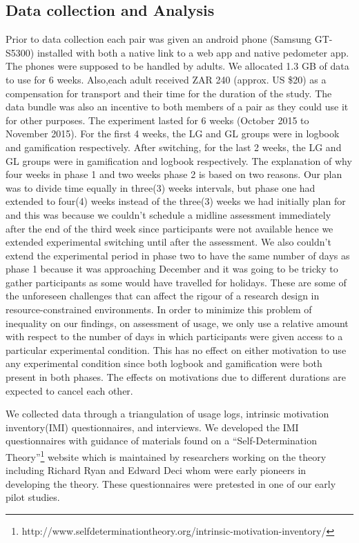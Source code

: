 \documentclass{sig-alternate}
\begin{document}
\subsection{Data collection and Analysis} 
Prior to data collection each pair was given an android phone (Samsung
GT-S5300) installed with both a native link to a web app and native pedometer app. The phones were supposed to be handled by adults. We allocated 1.3 GB of data to use for 6 weeks. Also,each adult received ZAR 240 (approx. US \$20) as a compensation for transport and their time for the duration of the study. The data bundle was also an incentive to both members of a pair as they could use it for other purposes. \newline
The experiment lasted for 6 weeks (October 2015 to November 2015). For the first 4 weeks, the LG and GL groups were in logbook and gamification respectively. After switching, for the last 2 weeks, the LG and GL groups were in gamification and logbook respectively. The explanation of why four weeks in phase 1 and two weeks phase 2 is based on two reasons. Our plan was to divide time equally in three(3) weeks intervals, but phase one had extended to four(4) weeks instead of the three(3) weeks we had initially plan for and this was because we couldn't schedule a midline assessment immediately after the end of the third week since participants were not available hence we extended experimental switching until after the assessment. We also couldn't extend the experimental period in phase two to have the same number of days as phase 1 because it was approaching December and it was going to be tricky to gather participants as some would have travelled for holidays. These are some of the unforeseen challenges that can affect the rigour of a research design in resource-constrained environments.  In order to minimize this problem of inequality on our findings, on assessment of usage, we only use a relative amount with respect to the number of days in which participants were given access to a particular experimental condition. This has no effect on either motivation to use any experimental condition since both logbook and gamification were both present in both phases. The effects on motivations due to different durations are expected to cancel each other.

We collected data through a triangulation of usage logs, intrinsic motivation inventory(IMI) questionnaires, and interviews. We developed the IMI questionnaires with guidance of materials found on a ``Self-Determination Theory''\footnote{http://www.selfdeterminationtheory.org/intrinsic-motivation-inventory/} website which is maintained by researchers working on the theory including Richard Ryan and Edward Deci\cite{deci1985intrinsic} whom were early pioneers in developing the theory. These questionnaires were pretested in one of our early pilot studies.
\end{document}

